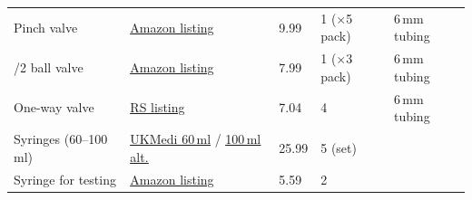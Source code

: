 \documentclass[10pt, a4paper]{article}
\begin{document}
\begin{table}[H]
\begin{tabularx}{\linewidth}{>{\raggedright\arraybackslash}X l l l l}
        Pinch valve
                       & \href{https://www.amazon.co.uk/TAILONZ-PNEUMATIC-Connect-Controller-Straight/dp/B0DPKJ96NF}{\uline{Amazon listing}}
                       & 9.99                                                                                                                                                                  & 1 (×5 pack)       & 6\,mm tubing                          \\

        3/2 ball valve
                       & \href{https://www.amazon.co.uk/TA-VIGOR-Shut-Off-Fittings-Non-Slip-Handle-3/dp/B0FPFTQHFG}{\uline{Amazon listing}}
                       & 7.99                                                                                                                                                                  & 1 (×3 pack)       & 6\,mm tubing                          \\

        One-way valve
                       & \href{https://uk.rs-online.com/web/p/pneumatic-non-return-valves/9160943}{\uline{RS listing}}
                       & 7.04                                                                                                                                                                  & 4                 & 6\,mm tubing                          \\

        Syringes (60--100\,ml)
                       & \href{https://ukmedi.co.uk/products/60ml-enfit-reusable-medicina-syringe-medicina-lhe60-ukmedi-co-uk}{\uline{UKMedi 60\,ml}} /
        \href{https://ukmedi.co.uk/products/100ml-enteral-isosaf-home2-standard-enfit-tip-syringes}{\uline{100\,ml alt.}}
                       & 25.99                                                                                                                                                                 & 5 (set)           &                                       \\

        Syringe for testing
                       & \href{https://www.amazon.co.uk/LargeCapacity-PlasticSyringe-Measuring-Syringefor-irrigation/dp/B0F8NPMMF2}{\uline{Amazon listing}}
                       & 5.59                                                                                                                                                                  & 2                 &                                       \\


\end{tabularx}
\end{table}
\end{document}
